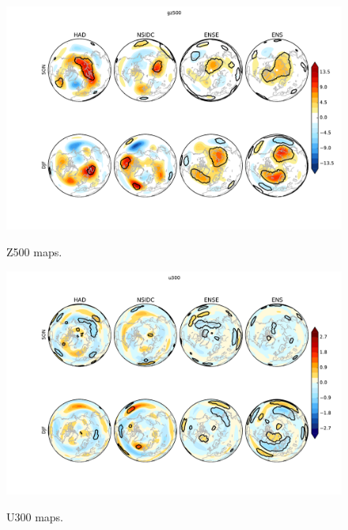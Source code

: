 \documentclass[twocol]{ametsoc}
\begin{document}
\begin{figure}[t]
  \noindent\includegraphics[width=35pc,angle=0]{gz500diffsigcont_enssubplot_forpap3_seas_nh2.pdf}\\ %
  \caption{Z500 maps.
}\label{fig:fig3c}
\end{figure}

\begin{figure}[t]
  \noindent\includegraphics[width=35pc,angle=0]{u300diffsigcont_enssubplot_forpap3_seas_nh2.pdf}\\ %
  \caption{U300 maps.
}\label{fig:fig3d}
\end{figure}
\end{document}
